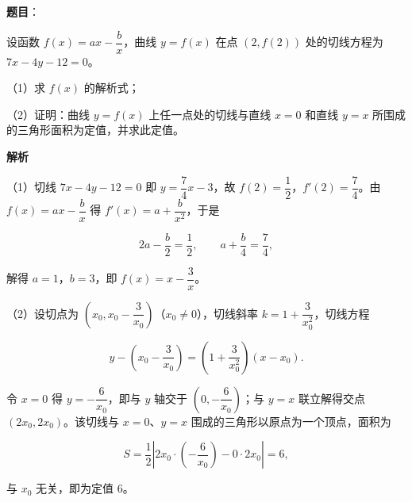 \begin{answer}

\textbf{题目}：

设函数 $f(x)=ax-\dfrac bx$，曲线 $y=f(x)$ 在点 $(2,f(2))$ 处的切线方程为 $7x-4y-12=0$。

（1）求 $f(x)$ 的解析式；

（2）证明：曲线 $y=f(x)$ 上任一点处的切线与直线 $x=0$ 和直线 $y=x$ 所围成的三角形面积为定值，并求此定值。

\textbf{解析}

（1）切线 $7x-4y-12=0$ 即 $y=\dfrac74x-3$，故 $f(2)=\dfrac12$，$f'(2)=\dfrac74$。由 $f(x)=ax-\dfrac bx$ 得 $f'(x)=a+\dfrac b{x^2}$，于是

\nopagebreak[4]
\[2a-\frac b2=\frac12,\qquad a+\frac b4=\frac74,\]

解得 $a=1$，$b=3$，即 $f(x)=x-\dfrac3x$。

（2）设切点为 $\left(x_0,x_0-\dfrac3{x_0}\right)$（$x_0\neq0$），切线斜率 $k=1+\dfrac3{x_0^2}$，切线方程

\nopagebreak[4]
\[y-\left(x_0-\frac3{x_0}\right)=\left(1+\frac3{x_0^2}\right)(x-x_0).\]

令 $x=0$ 得 $y=-\dfrac6{x_0}$，即与 $y$ 轴交于 $\left(0,-\dfrac6{x_0}\right)$；与 $y=x$ 联立解得交点 $(2x_0,2x_0)$。该切线与 $x=0$、$y=x$ 围成的三角形以原点为一个顶点，面积为

\nopagebreak[4]
\[S=\frac12\left|2x_0\cdot\left(-\frac6{x_0}\right)-0\cdot2x_0\right|=6,\]

与 $x_0$ 无关，即为定值 $6$。


\end{answer}
